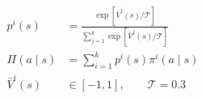 \documentclass[border=8pt,12pt]{standalone}
\begin{document}
\color{ink}
$\displaystyle \begin{aligned}p^i(s)&=\frac{\exp[\bar V^i(s)/\mathcal T]}{\sum_{j=1}^{k}\exp[\bar V^j(s)/\mathcal T]}\\ \Pi(a\mid s)&=\sum_{i=1}^{k}p^i(s)\pi^i(a\mid s)\\ \bar V^i(s)&\in[-1,1],\qquad\mathcal T=0.3\end{aligned}$
\end{document}
